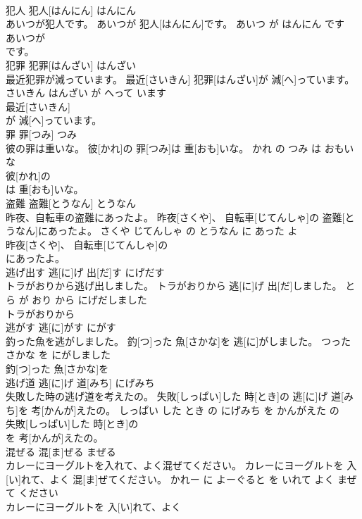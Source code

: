 \documentclass[8pt]{extreport}
\begin{document}
\begin{CJK}{UTF8}{min}
\\	犯人	犯人[はんにん]	はんにん	
\\	あいつが犯人です。	あいつが 犯人[はんにん]です。	あいつ が はんにん です	
\\	あいつが
\\	です。			
\\	犯罪	犯罪[はんざい]	はんざい	
\\	最近犯罪が減っています。	最近[さいきん] 犯罪[はんざい]が 減[へ]っています。	さいきん はんざい が へって います	
\\	最近[さいきん]
\\	が 減[へ]っています。			
\\	罪	罪[つみ]	つみ	
\\	彼の罪は重いな。	彼[かれ]の 罪[つみ]は 重[おも]いな。	かれ の つみ は おもい な	
\\	彼[かれ]の
\\	は 重[おも]いな。			
\\	盗難	盗難[とうなん]	とうなん	
\\	昨夜、自転車の盗難にあったよ。	昨夜[さくや]、 自転車[じてんしゃ]の 盗難[とうなん]にあったよ。	さくや じてんしゃ の とうなん に あった よ	
\\	昨夜[さくや]、 自転車[じてんしゃ]の
\\	にあったよ。			
\\	逃げ出す	逃[に]げ 出[だ]す	にげだす	
\\	トラがおりから逃げ出しました。	トラがおりから 逃[に]げ 出[だ]しました。	とら が おり から にげだしました	
\\	トラがおりから
\\	逃がす	逃[に]がす	にがす	
\\	釣った魚を逃がしました。	釣[つ]った 魚[さかな]を 逃[に]がしました。	つった さかな を にがしました	
\\	釣[つ]った 魚[さかな]を
\\	逃げ道	逃[に]げ 道[みち]	にげみち	
\\	失敗した時の逃げ道を考えたの。	失敗[しっぱい]した 時[とき]の 逃[に]げ 道[みち]を 考[かんが]えたの。	しっぱい した とき の にげみち を かんがえた の	
\\	失敗[しっぱい]した 時[とき]の
\\	を 考[かんが]えたの。			
\\	混ぜる	混[ま]ぜる	まぜる	
\\	カレーにヨーグルトを入れて、よく混ぜてください。	カレーにヨーグルトを 入[い]れて、よく 混[ま]ぜてください。	かれー に よーぐると を いれて よく まぜて ください	
\\	カレーにヨーグルトを 入[い]れて、よく

\end{CJK}
\end{document}
